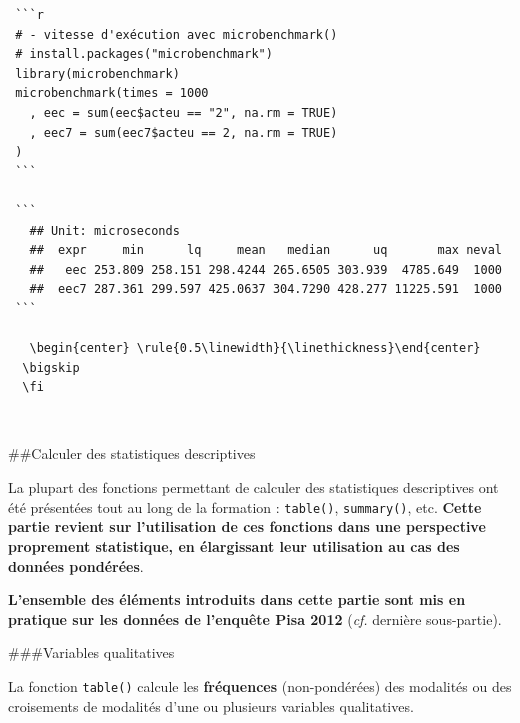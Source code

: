 \documentclass[12pt,twosided, notitlepage]{book}
\begin{document}
\begin{enumerate}
\begin{verbatim}
 ```r
 # - vitesse d'exécution avec microbenchmark()
 # install.packages("microbenchmark")
 library(microbenchmark)
 microbenchmark(times = 1000
   , eec = sum(eec$acteu == "2", na.rm = TRUE)
   , eec7 = sum(eec7$acteu == 2, na.rm = TRUE)
 )
 ```

 ```
   ## Unit: microseconds
   ##  expr     min      lq     mean   median      uq       max neval
   ##   eec 253.809 258.151 298.4244 265.6505 303.939  4785.649  1000
   ##  eec7 287.361 299.597 425.0637 304.7290 428.277 11225.591  1000
 ```

   \begin{center} \rule{0.5\linewidth}{\linethickness}\end{center} 
  \bigskip 
  \fi 
\end{verbatim}
\end{enumerate}

~

\#\#Calculer des statistiques descriptives

La plupart des fonctions permettant de calculer des statistiques
descriptives ont été présentées tout au long de la formation :
\texttt{table()}, \texttt{summary()}, etc. \textbf{Cette partie revient
sur l'utilisation de ces fonctions dans une perspective proprement
statistique, en élargissant leur utilisation au cas des données
pondérées}.

\textbf{L'ensemble des éléments introduits dans cette partie sont mis en
pratique sur les données de l'enquête Pisa 2012} (\emph{cf.} dernière
sous-partie).

\#\#\#Variables qualitatives

La fonction \texttt{table()} calcule les
\textbf{fréquences} (non-pondérées) des modalités ou des croisements de
modalités d'une ou plusieurs variables qualitatives.
\end{document}
